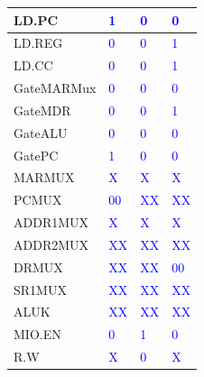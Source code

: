 \documentclass{article}
\begin{document}
\begin{enumerate}[label=(\alph*), itemsep = 30pt]
\begin{table}[h]
\begin{tabular}{|>{\centering\arraybackslash}p{2.5cm}|>{\centering\arraybackslash}p{2.5cm}|>{\centering\arraybackslash}p{2.5cm}|>{\centering\arraybackslash}p{2.5cm}|}
            \hline
            LD.PC & \textcolor{blue}{1} & \textcolor{blue}{0} & \textcolor{blue}{0}\\
            \hline
            LD.REG & \textcolor{blue}{0} & \textcolor{blue}{0} & \textcolor{blue}{1}\\
            \hline
            LD.CC & \textcolor{blue}{0} & \textcolor{blue}{0} & \textcolor{blue}{1}\\
            \hline
            GateMARMux & \textcolor{blue}{0} & \textcolor{blue}{0} & \textcolor{blue}{0}\\
            \hline
            GateMDR & \textcolor{blue}{0} & \textcolor{blue}{0} & \textcolor{blue}{1}\\
            \hline
            GateALU & \textcolor{blue}{0} & \textcolor{blue}{0} & \textcolor{blue}{0}\\
            \hline
            GatePC & \textcolor{blue}{1} & \textcolor{blue}{0} & \textcolor{blue}{0}\\
            \hline
            MARMUX & \textcolor{blue}{X} & \textcolor{blue}{X} & \textcolor{blue}{X}\\
            \hline
            PCMUX & \textcolor{blue}{00} & \textcolor{blue}{XX} & \textcolor{blue}{XX}\\
            \hline
            ADDR1MUX & \textcolor{blue}{X} & \textcolor{blue}{X} & \textcolor{blue}{X}\\
            \hline
            ADDR2MUX & \textcolor{blue}{XX} & \textcolor{blue}{XX} & \textcolor{blue}{XX}\\
            \hline
            DRMUX & \textcolor{blue}{XX} & \textcolor{blue}{XX} & \textcolor{blue}{00}\\
            \hline
            SR1MUX & \textcolor{blue}{XX} & \textcolor{blue}{XX} & \textcolor{blue}{XX}\\
            \hline
            ALUK & \textcolor{blue}{XX} & \textcolor{blue}{XX} & \textcolor{blue}{XX}\\
            \hline
            MIO.EN & \textcolor{blue}{0} & \textcolor{blue}{1} & \textcolor{blue}{0}\\
            \hline
            R.W & \textcolor{blue}{X} & \textcolor{blue}{0} & \textcolor{blue}{X}\\
            \hline
            \end{tabular}
            \label{tab:modified}
            \newpage
        \end{table}
        \newpage
    \end{enumerate}
\end{document}

